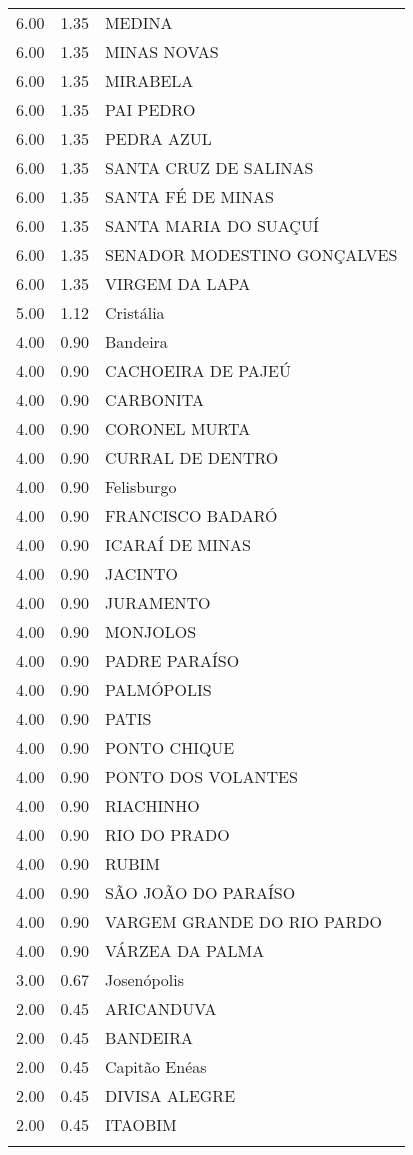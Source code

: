 \documentclass[a4paper, 12pt, openright, oneside, english, brazil, article]{abntex2}
\begin{document}
\begin{scriptsize}
\begin{longtable}{rrl}
			6.00 & 1.35 & MEDINA \\ 
			6.00 & 1.35 & MINAS NOVAS \\ 
			6.00 & 1.35 & MIRABELA \\ 
			6.00 & 1.35 & PAI PEDRO \\ 
			6.00 & 1.35 & PEDRA AZUL \\ 
			6.00 & 1.35 & SANTA CRUZ DE SALINAS \\ 
			6.00 & 1.35 & SANTA FÉ DE MINAS \\ 
			6.00 & 1.35 & SANTA MARIA DO SUAÇUÍ \\ 
			6.00 & 1.35 & SENADOR MODESTINO GONÇALVES \\ 
			6.00 & 1.35 & VIRGEM DA LAPA \\ 
			5.00 & 1.12 & Cristália \\ 
			4.00 & 0.90 & Bandeira \\ 
			4.00 & 0.90 & CACHOEIRA DE PAJEÚ \\ 
			4.00 & 0.90 & CARBONITA \\ 
			4.00 & 0.90 & CORONEL MURTA \\ 
			4.00 & 0.90 & CURRAL DE DENTRO \\ 
			4.00 & 0.90 & Felisburgo \\ 
			4.00 & 0.90 & FRANCISCO BADARÓ \\ 
			4.00 & 0.90 & ICARAÍ DE MINAS \\ 
			4.00 & 0.90 & JACINTO \\ 
			4.00 & 0.90 & JURAMENTO \\ 
			4.00 & 0.90 & MONJOLOS \\ 
			4.00 & 0.90 & PADRE PARAÍSO \\ 
			4.00 & 0.90 & PALMÓPOLIS \\ 
			4.00 & 0.90 & PATIS \\ 
			4.00 & 0.90 & PONTO CHIQUE \\ 
			4.00 & 0.90 & PONTO DOS VOLANTES \\ 
			4.00 & 0.90 & RIACHINHO \\ 
			4.00 & 0.90 & RIO DO PRADO \\ 
			4.00 & 0.90 & RUBIM \\ 
			4.00 & 0.90 & SÃO JOÃO DO PARAÍSO \\ 
			4.00 & 0.90 & VARGEM GRANDE DO RIO PARDO \\ 
			4.00 & 0.90 & VÁRZEA DA PALMA \\ 
			3.00 & 0.67 & Josenópolis \\ 
			2.00 & 0.45 & ARICANDUVA \\ 
			2.00 & 0.45 & BANDEIRA \\ 
			2.00 & 0.45 & Capitão Enéas \\ 
			2.00 & 0.45 & DIVISA ALEGRE \\ 
			2.00 & 0.45 & ITAOBIM \\ 
			\hline
			\hline
			\label{semoutorga}
		\end{longtable}
	\end{scriptsize}	
	
	
	
	
	
	
	
\end{document}
